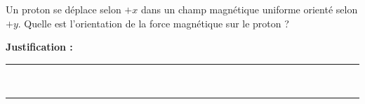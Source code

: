 Un proton se déplace selon $+x$ dans un champ magnétique uniforme orienté selon $+y$. Quelle est l'orientation de la force magnétique sur le proton ?

\choices

\noindent\textbf{Justification :} \hrulefill \\[2.5ex]
\rule{\linewidth}{0.4pt} \\[2.5ex]
\rule{\linewidth}{0.4pt}
\vfill

